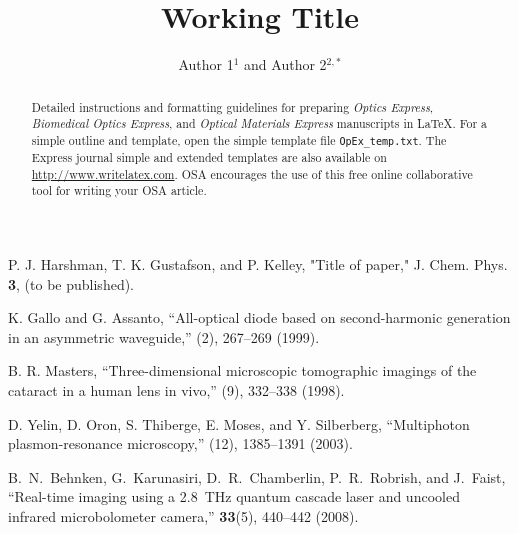 \documentclass[10pt,letterpaper]{article}
\begin{document}
\title{Working Title}

\author{Author 1$^1$ and Author 2$^{2,*}$}

\address{$^1$Department of Physics and Astronomy, University of Pennsylvania, Philadelphia, PA 19104, USA\\
$^2$Publications Department, Optical Society of America, Washington, D.C., 20036, USA}




\begin{abstract}
Detailed instructions and formatting guidelines for preparing \textit{Optics Express}, \textit{Biomedical Optics Express}, and \textit{Optical Materials Express} manuscripts in \LaTeX. For a simple outline and template, open the simple template file \texttt{OpEx\_temp.txt}. The Express journal simple and extended templates are also available on \url{http://www.writelatex.com}. OSA encourages the use of this free online collaborative tool for writing your OSA article.
\end{abstract}


\begin{thebibliography}{99}
P. J. Harshman, T. K. Gustafson, and P. Kelley, "Title of paper," J. Chem. Phys. {\bf 3}, (to be published).

 K. Gallo and G. Assanto, ``All-optical diode based on second-harmonic generation in an asymmetric waveguide,'' (2), 267--269 (1999).

 B. R. Masters, ``Three-dimensional microscopic tomographic imagings of the cataract in a human lens in vivo,'' (9), 332--338 (1998).

 D. Yelin,  D. Oron,  S. Thiberge,  E. Moses, and Y. Silberberg, ``Multiphoton plasmon-resonance microscopy,'' (12), 1385--1391 (2003).

B.~N.~Behnken, G.~Karunasiri, D.~R.~Chamberlin, P.~R.~Robrish, and J.~Faist,
``Real-time imaging using a 2.8~THz quantum cascade laser and uncooled infrared microbolometer camera,''
\ol \textbf{33}(5), 440--442 (2008).

\end{thebibliography}
\end{document}
